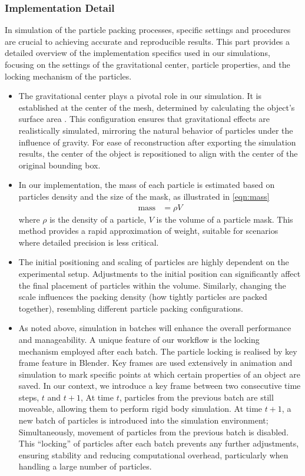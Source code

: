\documentclass[preprint,12pt]{elsarticle}
\begin{document}
\subsubsection{Implementation Detail} \label{subsubsec:syn:simu:imp_detail}
In simulation of the particle packing processes, specific settings and procedures are crucial to achieving accurate and reproducible results. 
This part provides a detailed overview of the implementation specifics used in our simulations, focusing on the settings of the gravitational center, particle properties, and the locking mechanism of the particles.
\begin{itemize}
    \item 
    The gravitational center plays a pivotal role in our simulation. 
    It is established at the center of the mesh, determined by calculating the object's surface area \citep{blender2023objectops}. 
    This configuration ensures that gravitational effects are realistically simulated, mirroring the natural behavior of particles under the influence of gravity. 
    For ease of reconstruction after exporting the simulation results, the center of the object is repositioned to align with the center of the original bounding box.
    \item
    In our implementation, the mass of each particle is estimated based on particles density and the size of the mask, as illustrated in \cref{eqn:mass}
    \begin{align}
        \text{mass} &= \rho V \label{eqn:mass}
    \end{align}
    where $\rho$ is the density of a particle, $V$ is the volume of a particle mask.
    This method provides a rapid approximation of weight, suitable for scenarios where detailed precision is less critical. 
    \item
    The initial positioning and scaling of particles are highly dependent on the experimental setup. 
    Adjustments to the initial position can significantly affect the final placement of particles within the volume. 
    Similarly, changing the scale influences the packing density (how tightly particles are packed together), resembling different particle packing configurations.
    \item 
    As noted above, simulation in batches will enhance the overall performance and manageability. 
    A unique feature of our workflow is the locking mechanism employed after each batch.
    The particle locking is realised by key frame feature in Blender.
    Key frames are used extensively in animation and simulation to mark specific points at which certain properties of an object are saved. 
    In our context, we introduce a key frame between two consecutive time steps, $t$ and $t + 1$, 
    At time $t$, particles from the previous batch are still moveable, allowing them to perform rigid body simulation.
    At time $t+1$, a new batch of particles is introduced into the simulation environment;
    Simultaneously, movement of particles from the previous batch is disabled. 
    This ``locking'' of particles after each batch prevents any further adjustments, ensuring stability and reducing computational overhead, particularly when handling a large number of particles.
\end{itemize}
\end{document}
